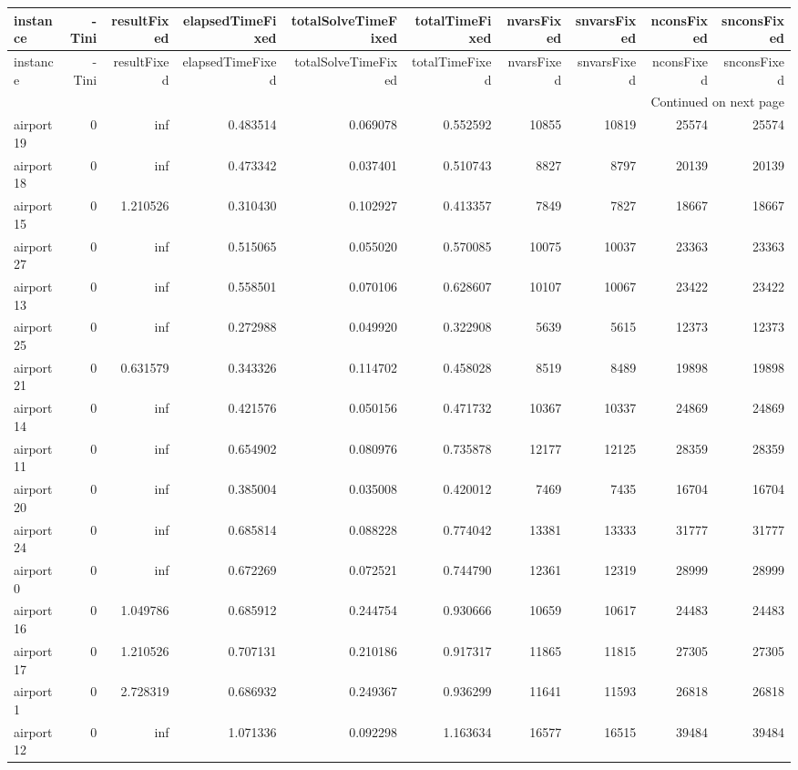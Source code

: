 \begin{longtable}{|l|r|r|r|r|r|r|r|r|r|}
\toprule
instance & -Tini & resultFixed & elapsedTimeFixed & totalSolveTimeFixed & totalTimeFixed & nvarsFixed & snvarsFixed & nconsFixed & snconsFixed \\
\midrule
\endfirsthead
\toprule
instance & -Tini & resultFixed & elapsedTimeFixed & totalSolveTimeFixed & totalTimeFixed & nvarsFixed & snvarsFixed & nconsFixed & snconsFixed \\
\midrule
\endhead
\midrule
\multicolumn{10}{r}{Continued on next page} \\
\midrule
\endfoot
\bottomrule
\endlastfoot
airport19 & 0 & inf & 0.483514 & 0.069078 & 0.552592 & 10855 & 10819 & 25574 & 25574 \\
airport18 & 0 & inf & 0.473342 & 0.037401 & 0.510743 & 8827 & 8797 & 20139 & 20139 \\
airport15 & 0 & 1.210526 & 0.310430 & 0.102927 & 0.413357 & 7849 & 7827 & 18667 & 18667 \\
airport27 & 0 & inf & 0.515065 & 0.055020 & 0.570085 & 10075 & 10037 & 23363 & 23363 \\
airport13 & 0 & inf & 0.558501 & 0.070106 & 0.628607 & 10107 & 10067 & 23422 & 23422 \\
airport25 & 0 & inf & 0.272988 & 0.049920 & 0.322908 & 5639 & 5615 & 12373 & 12373 \\
airport21 & 0 & 0.631579 & 0.343326 & 0.114702 & 0.458028 & 8519 & 8489 & 19898 & 19898 \\
airport14 & 0 & inf & 0.421576 & 0.050156 & 0.471732 & 10367 & 10337 & 24869 & 24869 \\
airport11 & 0 & inf & 0.654902 & 0.080976 & 0.735878 & 12177 & 12125 & 28359 & 28359 \\
airport20 & 0 & inf & 0.385004 & 0.035008 & 0.420012 & 7469 & 7435 & 16704 & 16704 \\
airport24 & 0 & inf & 0.685814 & 0.088228 & 0.774042 & 13381 & 13333 & 31777 & 31777 \\
airport0 & 0 & inf & 0.672269 & 0.072521 & 0.744790 & 12361 & 12319 & 28999 & 28999 \\
airport16 & 0 & 1.049786 & 0.685912 & 0.244754 & 0.930666 & 10659 & 10617 & 24483 & 24483 \\
airport17 & 0 & 1.210526 & 0.707131 & 0.210186 & 0.917317 & 11865 & 11815 & 27305 & 27305 \\
airport1 & 0 & 2.728319 & 0.686932 & 0.249367 & 0.936299 & 11641 & 11593 & 26818 & 26818 \\
airport12 & 0 & inf & 1.071336 & 0.092298 & 1.163634 & 16577 & 16515 & 39484 & 39484 \\

\end{longtable}
